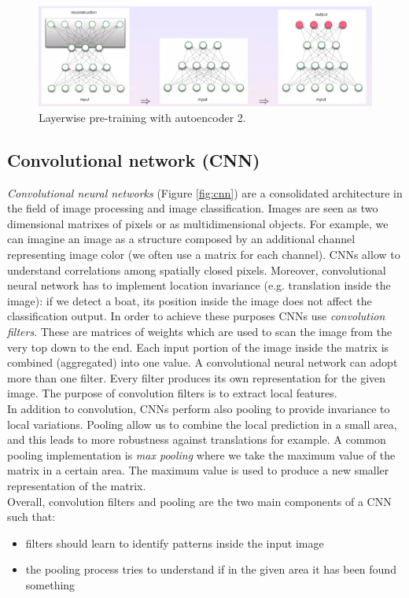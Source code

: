 \begin{figure}
    \centering
    \includegraphics[width=\textwidth]{images/autoencoder_layerwise2.png}
    \caption{Layerwise pre-training with autoencoder 2.}
    \label{fig:autoencoder_layerwise2}
\end{figure}

\subsection{Convolutional network (CNN)}
\textit{Convolutional neural networks} (Figure \ref{fig:cnn}) are a consolidated architecture in the field of image processing and image classification. Images are seen as two dimensional matrixes of pixels or as multidimensional objects. For example, we can imagine an image as a structure composed by an additional channel representing image color (we often use a matrix for each channel). CNNs allow to understand correlations among spatially closed pixels. Moreover, convolutional neural network has to implement location invariance (e.g. translation inside the image): if we detect a boat, its position inside the image does not affect the classification output. In order to achieve these purposes CNNs use \textit{convolution filters}. These are matrices of weights which are used to scan the image from the very top down to the end. Each input portion of the image inside the matrix is combined (aggregated) into one value. A convolutional neural network can adopt more than one filter. Every filter produces its own representation for the given image. The purpose of convolution filters is to extract local features. \\ In addition to convolution, CNNs perform also pooling to provide invariance to local variations. Pooling allow us to combine the local prediction in a small area, and this leads to more robustness against translations for example. A common pooling implementation is \textit{max pooling} where we take the maximum value of the matrix in a certain area. The maximum value is used to produce a new smaller representation of the matrix. \\ Overall, convolution filters and pooling are the two main components of a CNN such that:
\begin{itemize}
    \item filters should learn to identify patterns inside the input image
    
    \item the pooling process tries to understand if in the given area it has been found something 
\end{itemize}

